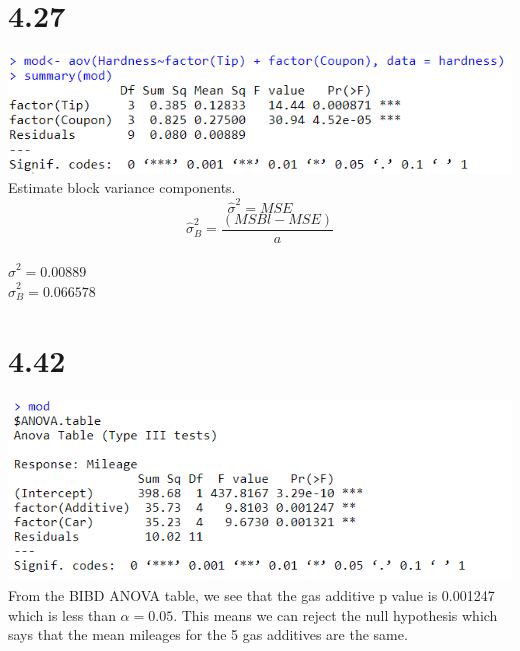 \documentclass{article}
\begin{document}
\section*{4.27}
    \includegraphics{4.11a.PNG}
    \\Estimate block variance components.
    $$\hat{\sigma}^2 = MSE$$
    $$\hat{\sigma}_B^2 = \frac{(MSBl - MSE)}{a}$$
    \\$\hat{\sigma}^2 = 0.00889$
    \\$\hat{\sigma}_B^2 = 0.066578$

\section*{4.42}
\includegraphics{4.42.PNG}
\\From the BIBD ANOVA table, we see that the gas additive p value is 0.001247 which is less than $\alpha = 0.05$. This means we can reject the null hypothesis which says that the mean mileages for the 5 gas additives are the same.
\end{document}
